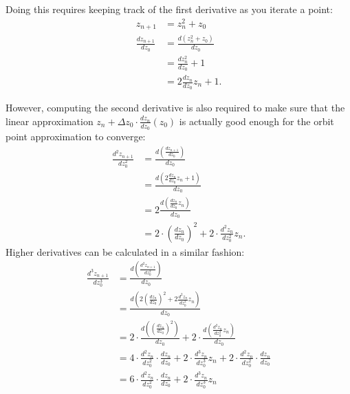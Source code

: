 \documentclass[12pt,a4paper]{article}
\newcommand{\eqar}[1]{\begin{align*} #1 \end{align*}}
\begin{document}
Doing this requires keeping track of the first derivative as you iterate a point:
\eqar{
	z_{n+1} &= z_n^2+z_0\\
	\frac{dz_{n+1}}{dz_0} &= \frac{d(z_n^2+z_0)}{dz_0}\\
	&= \frac{dz_n^2}{dz_0}+1\\
	&= 2\frac{dz_n}{dz_0}z_n+1.
}

However, computing the second derivative is also required to make sure that the linear approximation $z_n+\Delta z_0\cdot\frac{dz_n}{dz_0}(z_0)$ is actually good enough for the orbit point approximation to converge:
\eqar{
	\frac{d^2z_{n+1}}{dz_0^2} &= \frac{d(\frac{dz_{n+1}}{dz_0})}{dz_0}\\
	&= \frac{d(2\frac{dz_n}{dz_0}z_n+1)}{dz_0}\\
	&= 2\frac{d(\frac{dz_n}{dz_0}z_n)}{dz_0}\\
	&= 2\cdot(\frac{dz_n}{dz_0})^2+2\cdot\frac{d^2z_n}{dz_0^2}z_n.
}
Higher derivatives can be calculated in a similar fashion:
\eqar{
	\frac{d^3z_{n+1}}{dz_0^3} &= \frac{d(\frac{d^2z_{n+1}}{dz_0^2})}{dz_0}\\
	&= \frac{d(2(\frac{dz_n}{dz_0})^2+2\frac{d^2z_n}{dz_0^2}z_n)}{dz_0}\\
	&= 2\cdot\frac{d((\frac{dz_n}{dz_0})^2)}{dz_0}+2\cdot\frac{d(\frac{d^2z_n}{dz_0^2}z_n)}{dz_0}\\
	&= 4\cdot\frac{d^2z_n}{dz_0^2}\cdot\frac{dz_n}{dz_0}+2\cdot\frac{d^3z_n}{dz_0^3}z_n+2\cdot\frac{d^2z_n}{dz_0^2}\cdot\frac{dz_n}{dz_0}\\
	&= 6\cdot\frac{d^2z_n}{dz_0^2}\cdot\frac{dz_n}{dz_0}+2\cdot\frac{d^3z_n}{dz_0^3}z_n
}
\end{document}
